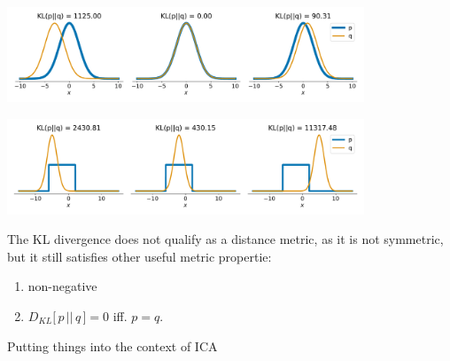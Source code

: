 \begin{frame}{\subsecname}

\begin{center}
	\includegraphics[width=0.8\textwidth]{img/kl_normal}
	
	\pause
	
	\includegraphics[width=0.8\textwidth]{img/kl_uniform_normal}
\end{center}

\pause 

The KL divergence does not qualify as a distance metric, as it is not symmetric, but it still satisfies other useful metric propertie:
\begin{enumerate}
\item non-negative
\item $D_{KL}\lbrack\,p\, ||\, q\,\rbrack = 0$ iff. $p = q$.
\end{enumerate}


\end{frame}


\clearpage 

\begin{frame}{Putting things into the context of ICA}


\end{frame}

